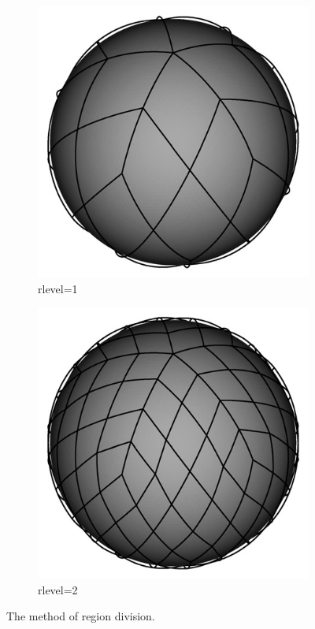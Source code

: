 \begin{figure}[htb]
\begin{subfigure}{.3\textwidth}
\includegraphics[width=\textwidth]{figs/Tomita_etal_2008_SIAM-8-1.png}
\caption{rlevel=1}\label{f:rlevel=1}
\end{subfigure}
\begin{subfigure}{.3\textwidth}
\centering
\includegraphics[width=\textwidth]{figs/Tomita_etal_2008_SIAM-8-2.png}
\caption{rlevel=2}
\end{subfigure}
\caption{The method of region division. \citep{Tomita:2008jc}}%
 \label{f:region_division}
\end{figure}



